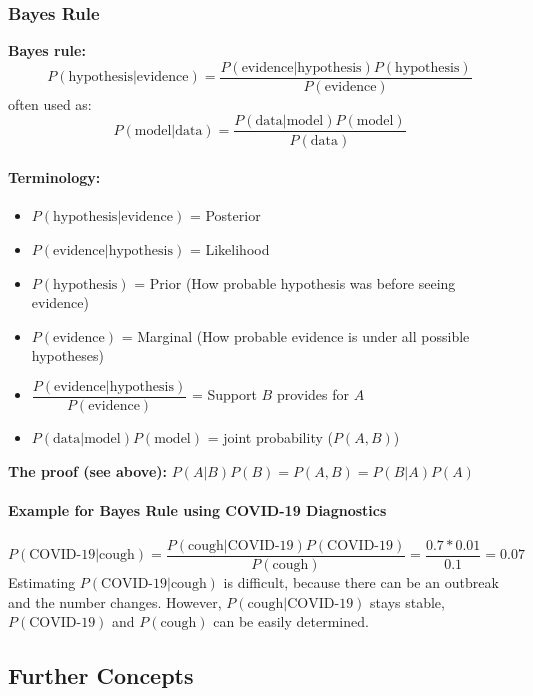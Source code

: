 \documentclass[../main.tex]{subfiles}
\begin{document}
    \subsubsection{Bayes Rule} 
        \textbf{Bayes rule:} $$ P(\text{hypothesis}|\text{evidence}) =\dfrac{P(\text{evidence}|\text{hypothesis})P(\text{hypothesis})}{P(\text{evidence})}$$
        often used as: 
        $$P(\text{model}|\text{data}) =\dfrac{P(\text{data}|\text{model})P(\text{model})}{P(\text{data})}$$
        
        \paragraph{Terminology:}
        \begin{itemize}
            \item $P(\text{hypothesis}|\text{evidence})$ = Posterior 
            \item $P(\text{evidence}|\text{hypothesis})$ = Likelihood
            \item $P(\text{hypothesis})$ = Prior (How probable hypothesis was before seeing evidence)
            \item $P(\text{evidence})$ = Marginal (How probable evidence is under all possible hypotheses)
            \item $\dfrac{P(\text{evidence}|\text{hypothesis})}{P(\text{evidence})}$ = Support $B$ provides for $A$
            \item $P(\text{data}|\text{model})P(\text{model})$ = joint probability ($P(A,B)$)
            
        \end{itemize}
        \textbf{The proof (see above):} $P(A|B)P(B)=P(A,B)= P(B|A)P(A)$

        \paragraph{Example for Bayes Rule using COVID-19 Diagnostics} $$P(\text{COVID-19}|\text{cough}) =\dfrac{P(\text{cough}|\text{COVID-19})P(\text{COVID-19})}{P(\text{cough})} = \frac{0.7*0.01}{0.1}=0.07$$ Estimating $P(\text{COVID-19}|\text{cough})$ is difficult, because there can be an outbreak and the number changes. However, $P(\text{cough}|\text{COVID-19})$ stays stable, $P(\text{COVID-19})$ and $P(\text{cough})$ can be easily determined.


\subsection{Further Concepts}
\end{document}
